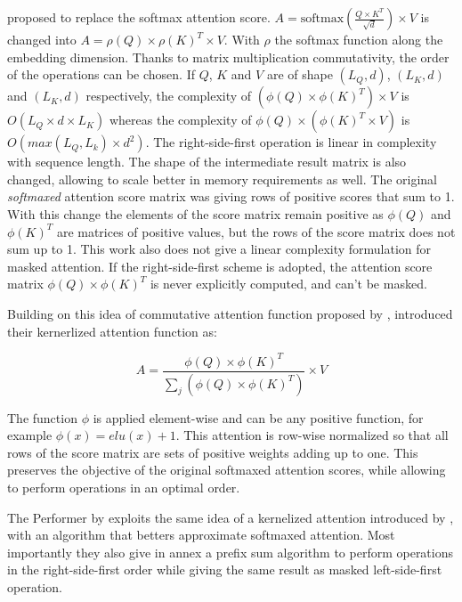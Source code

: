 \citet{shen2020efficient} proposed to
 replace the softmax attention score.
 $A = \mathrm{softmax}\left(\frac{Q \times K^T}{\sqrt{d}}\right) \times V$ is
changed into $A = \rho(Q) \times \rho(K)^T \times V$. With $\rho$
the softmax function along the embedding dimension. Thanks to matrix
multiplication commutativity, the order of the operations can be chosen.
If $Q$, $K$ and $V$ are of shape $(L_Q, d)$, $(L_K, d)$ and
$(L_K, d)$ respectively, the complexity of
$(\phi(Q) \times \phi(K)^T) \times V$ is $O(L_Q \times d \times L_K)$ whereas the complexity of
$\phi(Q) \times (\phi(K)^T \times V)$ is
$O\left(max(L_Q, L_k) \times d^2 \right)$. The right-side-first
operation is linear in complexity with sequence length. The shape of the
intermediate result matrix is also changed, allowing to scale better
in memory requirements as well. The original \emph{softmaxed} attention score
matrix was giving rows of positive scores that sum to 1. With this
change the elements of the score matrix remain positive as $\phi(Q)$
and $\phi(K)^T$ are matrices of positive values, but the rows of the
score matrix does not sum up to 1. This work also does not give a linear complexity formulation for masked attention. If the right-side-first
scheme is adopted, the attention score matrix
$\phi(Q) \times \phi(K)^T$ is never explicitly computed, and can't be
masked.

Building on this idea of commutative attention function proposed by
\citep{shen2020efficient}, \citet{katharopoulos2020transformers} introduced their kernerlized attention function as:

\begin{equation}
A = \frac{\phi(Q) \times \phi(K)^T}{\sum_j \left( \phi(Q) \times \phi(K)^T \right)} \times V
\end{equation}

The function $\phi$ is applied element-wise and can be any positive
function, for example $\phi(x) = elu(x) + 1$. This attention is
row-wise normalized so that all rows of the score matrix are sets of
positive weights adding up to one. This preserves the objective of the
original softmaxed attention scores, while allowing to perform
operations in an optimal order.

The Performer by \citet{choromanski2021rethinking} exploits the same idea of a kernelized attention introduced
by \citet{katharopoulos2020transformers}, with an algorithm that betters approximate softmaxed attention. Most
importantly they also give in annex a prefix sum algorithm to perform
operations in the right-side-first order while giving the same result as
masked left-side-first operation.

